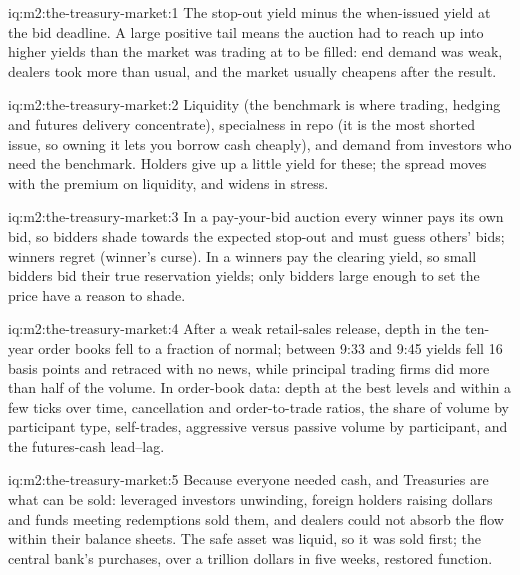 \begin{solution}{iq:m2:the-treasury-market:1}
The stop-out yield minus the when-issued yield at the bid deadline. A large
positive tail means the auction had to reach up into higher yields than the
market was trading at to be filled: end demand was weak, dealers took more
than usual, and the market usually cheapens after the result.
\end{solution}

\begin{solution}{iq:m2:the-treasury-market:2}
Liquidity (the benchmark is where trading, hedging and futures delivery
concentrate), specialness in repo (it is the most shorted issue, so owning
it lets you borrow cash cheaply), and demand from investors who need the
benchmark. Holders give up a little yield for these; the spread moves with
the premium on liquidity, and widens in stress.
\end{solution}

\begin{solution}{iq:m2:the-treasury-market:3}
In a pay-your-bid auction every winner pays its own bid, so bidders shade
towards the expected stop-out and must guess others' bids; winners regret
(winner's curse). In a  winners pay the clearing yield,
so small bidders bid their true reservation yields; only bidders large enough
to set the price have a reason to shade.
\end{solution}

\begin{solution}{iq:m2:the-treasury-market:4}
After a weak retail-sales release, depth in the ten-year order books fell to a
fraction of normal; between 9:33 and 9:45 yields fell 16 basis points and
retraced with no news, while principal trading firms did more than half of
the volume. In order-book data: depth at the best levels and within a few
ticks over time, cancellation and order-to-trade ratios, the share of volume
by participant type, self-trades, aggressive versus passive volume by
participant, and the futures-cash lead--lag.
\end{solution}

\begin{solution}{iq:m2:the-treasury-market:5}
Because everyone needed cash, and Treasuries are what can be sold: leveraged
investors unwinding, foreign holders raising dollars and funds meeting
redemptions sold them, and dealers could not absorb the flow within their
balance sheets. The safe asset was liquid, so it was sold first; the central
bank's purchases, over a trillion dollars in five weeks, restored function.
\end{solution}

